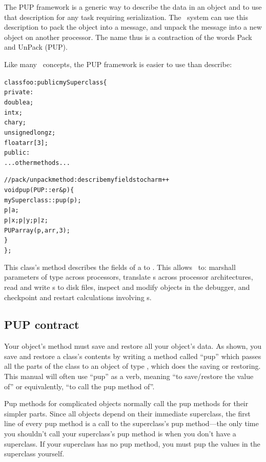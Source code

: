 \label{sec:pup}

The  PUP framework is a generic way to describe the data in an object and to use that description for any task requiring serialization.
The \charmpp\ system can use this description to pack the object 
into a message, and unpack the message into a new object on another 
processor. 
The name thus is a contraction of the words Pack and UnPack (PUP). 

Like many \CC\ concepts, the PUP framework is easier to use than 
describe: 

\begin{alltt}
class foo : public mySuperclass \{
 private:
    double a;
    int x;
    char y;
    unsigned long z;
    float arr[3];
 public:
    ...other methods...

    //pack/unpack method: describe my fields to charm++
    void pup(PUP::er &p) \{
      mySuperclass::pup(p);
      p|a;
      p|x; p|y; p|z;
      PUParray(p,arr,3);
    \}
\};
\end{alltt}

This class's  method describes the fields of a  to \charmpp{}.
This allows \charmpp\ to: marshall parameters of type  across processors,
translate s across processor architectures, read and write s
to disk files, inspect and modify  objects in the debugger, and 
checkpoint and restart calculations involving s.



\subsection{PUP contract}

\label{sec:pupcontract}
Your object's  method must save and restore all your object's
data.  As shown, you save and restore a class's contents by writing a
method called ``pup'' which passes all the parts of the class to an
object of type  , which does the saving or
restoring.  This manual will often use ``pup'' as a verb, meaning ``to
save/restore the value of'' or equivalently, ``to call the pup method
of''.

Pup methods for complicated objects normally call the pup methods
for their simpler parts.  Since all objects depend on their immediate
superclass, the first line of every pup method is a call to the 
superclass's pup method---the only time you shouldn't call your superclass's
pup method is when you don't have a superclass.  If your superclass has
no pup method, you must pup the values in the superclass yourself.


